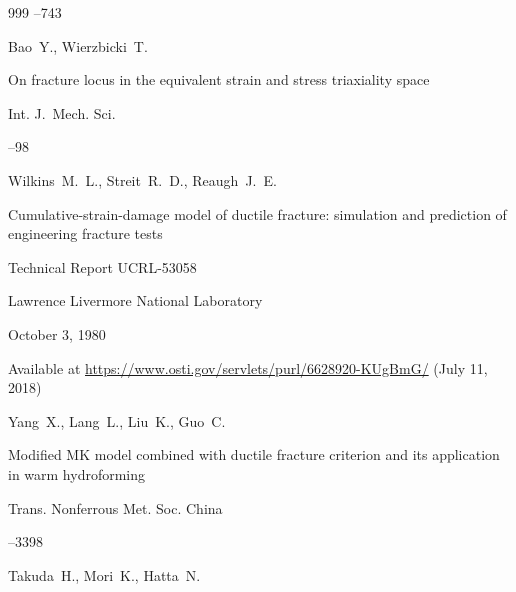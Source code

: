 \begin{thebibliography}{999}
--743






\by Bao~Y., Wierzbicki~T. 

\paper On fracture locus in the equivalent strain and stress triaxiality space

\jour Int. J.~Mech. Sci.




--98






\by Wilkins~M.~L., Streit~R.~D., Reaugh~J.~E.

\thesis Cumulative-strain-damage model of ductile fracture: simulation and prediction of engineering fracture tests

\thesisinfo Technical Report UCRL-53058

\publaddr Lawrence Livermore National Laboratory

\yr October 3, 1980

\elink Available at \url{https://www.osti.gov/servlets/purl/6628920-KUgBmG/} (July 11, 2018)








\by Yang~X., Lang~L., Liu~K., Guo~C. 

\paper Modified MK model combined with ductile fracture criterion and its application in warm hydroforming

\jour Trans. Nonferrous Met. Soc. China




--3398





\by Takuda~H., Mori~K., Hatta~N.  


\end{thebibliography}
